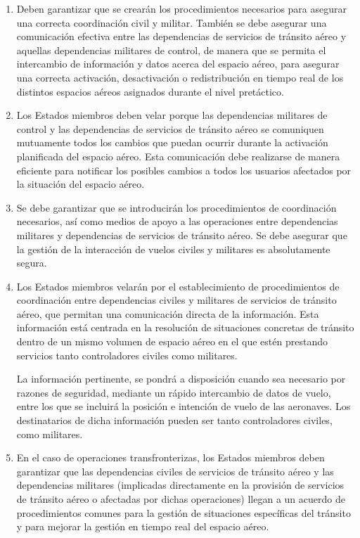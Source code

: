 \begin{enumerate}
    \item Deben garantizar que se crearán los procedimientos necesarios para asegurar una correcta coordinación civil y militar. También se debe asegurar una comunicación efectiva entre las dependencias de servicios de tránsito aéreo y aquellas dependencias militares de control, de manera que se permita el intercambio de información y datos acerca del espacio aéreo, para asegurar una correcta activación, desactivación o redistribución en tiempo real de los distintos espacios aéreos asignados durante el nivel pretáctico.
    
    \item Los Estados miembros deben velar porque las dependencias militares de control y las dependencias de servicios de tránsito aéreo se comuniquen mutuamente todos los cambios que puedan ocurrir durante la activación planificada del espacio aéreo. Esta comunicación debe realizarse de manera eficiente para notificar los posibles cambios a todos los usuarios afectados por la situación del espacio aéreo.
    
    \item Se debe garantizar que se introducirán los procedimientos de coordinación necesarios, así como medios de apoyo a las operaciones entre dependencias militares y dependencias de servicios de tránsito aéreo. Se debe asegurar que la gestión de la interacción de vuelos civiles y militares es absolutamente segura.
    
    \item Los Estados miembros velarán por el establecimiento de procedimientos de coordinación entre dependencias civiles y militares de servicios de tránsito aéreo, que permitan una comunicación directa de la información. Esta información está centrada en la resolución de situaciones concretas de tránsito dentro de un mismo volumen de espacio aéreo en el que estén prestando servicios tanto controladores civiles como militares.
    
    La información pertinente, se pondrá a disposición cuando sea necesario por razones de seguridad, mediante un rápido intercambio de datos de vuelo, entre los que se incluirá la posición e intención de vuelo de las aeronaves. Los destinatarios de dicha información pueden ser tanto controladores civiles, como militares.
    
    \item En el caso de operaciones transfronterizas, los Estados miembros deben garantizar que las dependencias civiles de servicios de tránsito aéreo y las dependencias militares (implicadas directamente en la provisión de servicios de tránsito aéreo o afectadas por dichas operaciones) llegan a un acuerdo de procedimientos comunes para la gestión de situaciones específicas del tránsito y para mejorar la gestión en tiempo real del espacio aéreo.
\end{enumerate}

